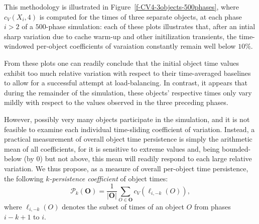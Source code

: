 This methodology is illustrated in
Figure~\ref{f-CV4-3objects-500phases}, where $c_V(X_i,4)$ is computed
for the times of three separate objects, at each phase $i>2$ of a
$500$-phase simulation: each of these plots illustrates that, after an
intial sharp variation due to cache warm-up and other initilization
transients, the time-windowed per-object coefficients of varaiation
constantly remain well below $10\%$.

From these plots one can readily conclude that the initial object time
values exhibit too much relative variation with respect to their
time-averaged baselines to allow for a successful attempt at
load-balancing. In contrast, it appears that during the remainder of
the simulation, these objects' respective times only vary mildly with
respect to the values observed in the three preceding phases.

However, possibly very many objects participate in the simulation, and
it is not feasible to examine each individual time-sliding coefficient
of variation. Instead, a practical measurement of overall object time
persistence is simply the arithmetic mean of all coefficients, for it
is sensitive to extreme values and, being bounded-below (by $0$) but
not above, this mean will readily respond to each large relative
variation. We thus propose, as a measure of overall per-object time
persistence, the following \emph{$k$-persistence coefficient} of
object times:
\[
\mathcal{P}_k(\textbf{O}) = \frac{1}{\lvert\textbf{O}\rvert}
\sum_{O\in\textbf{O}} c_V(\ell_{i,-k}(O)),
\]
where $\ell_{i,-k}(O)$ denotes the subset of times of an object $O$
from phases $i-k+1$ to $i$.

